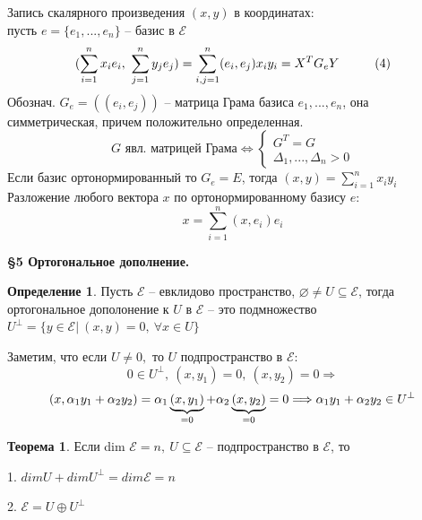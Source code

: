 \documentclass[a4paper, 12pt]{article}
\newcommand\tab[1][.5cm]{\hspace*{#1}}
\theoremstyle{definition}
\newtheorem*{definition}{Определение}
\newtheorem*{theorem}{Теорема}
\begin{document}
    Запись скалярного произведения $(x,y)$ в координатах:\\
    пусть $e = \{e_1,...,e_n\}$ -- базис в $\mathcal{E}$
    $$(\sum\limits_{i=1}^{n} x_ie_i,\ 
    \sum\limits_{j=1}^{n} y_je_j) = 
    \sum\limits_{i,j=1}^{n} (e_i,e_j)x_iy_i = X^TG_eY\tab[1cm] (4)$$
    Обознач. $G_e = ((e_i,e_j))$ -- матрица Грама базиса
    $e_1,...,e_n$, она симметрическая, причем положительно
    определенная.
    $$G \text{ явл. матрицей Грама} \Longleftrightarrow 
    \begin{cases}
        G^T = G\\ \Delta_1,...,\Delta_n > 0
    \end{cases}$$
    Если базис ортонормированный то $G_e = E$, тогда
    $(x,y) = \sum\limits_{i=1}^{n} x_iy_i$\\
    Разложение любого вектора $x$ по ортонормированному 
    базису $e$: $$x = \sum\limits_{i=1}^{n}(x,e_i)e_i$$
    \begin{center}
        \begin{Large}
            \textbf{\S 5 Ортогональное дополнение.}         
        \end{Large}
    \end{center}
    \begin{definition}
        Пусть $\mathcal{E}$ -- евклидово пространство,
        $\varnothing \neq U \subseteq \mathcal{E}$, тогда
        ортогональное дополонение к $U$ в $\mathcal{E}$ -- это 
        подмножество $U^\perp = \{y \in \mathcal{E}|\ 
        (x,y) = 0,\ \forall x \in U\}$ 
    \end{definition}
    Заметим, что если $U \neq 0,$ то $U$ подпространство в
    $\mathcal{E}$:
    $$0\in U^\perp,\ (x,y_1) = 0,\ (x,y_2) = 0 
    \Longrightarrow $$
    $$(x,\alpha_1y_1 + \alpha_2y_2) = \alpha_1\underbrace{(x
    ,y_1)}_{= 0} + \alpha_2\underbrace{(x,y_2)}_{= 0} = 0\\
    \Longrightarrow \alpha_1y_1 + \alpha_2y_2 \in U^\perp$$
    \begin{theorem}
        Если dim $\mathcal{E} = n,\ U \subseteq \mathcal{E}$ --
        подпространство в $\mathcal{E}$, то
        
        1. $dim U + dim U^\perp = dim\mathcal{E} = n$
       
        2. $\mathcal{E} = U \oplus U^\perp$ 
    \end{theorem}
\end{document}
